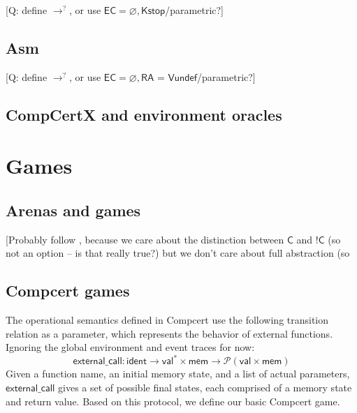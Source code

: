 \documentclass[acmsmall,anonymous]{acmart}
\newcommand{\kw}[1]{\ensuremath{ \textsf{#1} }}
\newcommand{\EC}{\kw{C}}
\begin{document}
[Q: define $\rightarrow^?$,
or use $\textsf{EC} = \varnothing, \textsf{Kstop}$/parametric?]


\subsection{Asm} %

[Q: define $\rightarrow^?$,
or use $\textsf{EC} = \varnothing, \textsf{RA = Vundef}$/parametric?]


\subsection{CompCertX and environment oracles}


\newpage
\section{Games} %

\subsection{Arenas and games} %

[Probably follow \citep{gamesem99},
because we care about the distinction between $\EC$ and $!\EC$
(so \citep{gref98} not an option -- is that really true?)
but we don't care about full abstraction
(so 


\subsection{Compcert games} %

The operational semantics defined in Compcert
use the following transition relation as a parameter,
which represents the behavior of external functions.
Ignoring the global environment and event traces for now:
\[
  \kw{external\_call} :
    \kw{ident} \rightarrow
    \kw{val}^* \times \kw{mem} \rightarrow
    \mathcal{P}(\kw{val} \times \kw{mem})
\]
Given a function name,
an initial memory state,
and a list of actual parameters,
$\kw{external\_call}$ gives a set of possible final states,
each comprised of a memory state and return value.
Based on this protocol,
we define our basic Compcert game.
\end{document}
